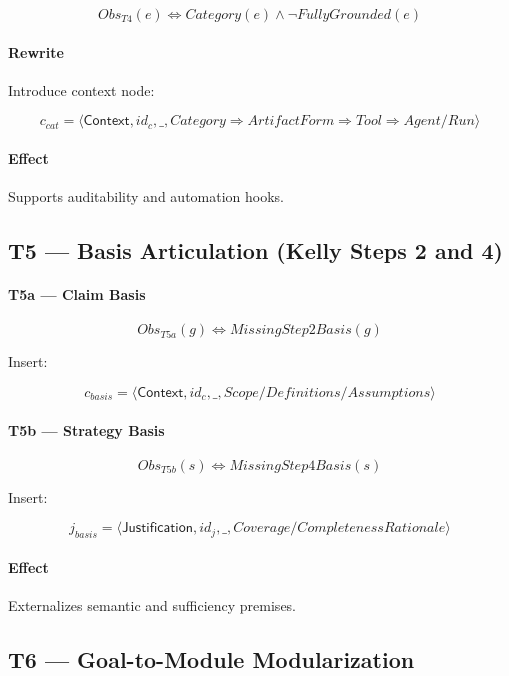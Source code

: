 \documentclass[12pt,twoside,a4paper]{article}
\begin{document}
\[
Obs_{T4}(e) \iff Category(e) \wedge \neg FullyGrounded(e)
\]

\paragraph{Rewrite}

Introduce context node:

\[
c_{cat} =
\langle \mathsf{Context}, id_c, \_, 
Category \Rightarrow ArtifactForm \Rightarrow Tool \Rightarrow Agent/Run \rangle
\]

\paragraph{Effect}
Supports auditability and automation hooks.

\subsection{T5 --- Basis Articulation (Kelly Steps 2 and 4)}

\paragraph{T5a --- Claim Basis}

\[
Obs_{T5a}(g) \iff MissingStep2Basis(g)
\]

Insert:

\[
c_{basis} = \langle \mathsf{Context}, id_c, \_, Scope/Definitions/Assumptions \rangle
\]

\paragraph{T5b --- Strategy Basis}

\[
Obs_{T5b}(s) \iff MissingStep4Basis(s)
\]

Insert:

\[
j_{basis} = \langle \mathsf{Justification}, id_j, \_, Coverage/CompletenessRationale \rangle
\]

\paragraph{Effect}
Externalizes semantic and sufficiency premises.

\subsection{T6 --- Goal-to-Module Modularization}
\end{document}
